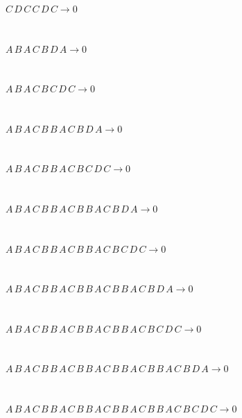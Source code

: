 \begin{minipage}{6in}
$
C\,
 D\,
 C\,
 C\,
 D\,
 C\rightarrow 0
$
\end{minipage}\medskip \\
\begin{minipage}{6in}
$
A\,
 B\,
 A\,
 C\,
 B\,
 D\,
 A\rightarrow 0
$
\end{minipage}\medskip \\
\begin{minipage}{6in}
$
A\,
 B\,
 A\,
 C\,
 B\,
 C\,
 D\,
 C\rightarrow 0
$
\end{minipage}\medskip \\
\begin{minipage}{6in}
$
A\,
 B\,
 A\,
 C\,
 B\,
 B\,
 A\,
 C\,
 B\,
 D\,
 A\rightarrow 0
$
\end{minipage}\medskip \\
\begin{minipage}{6in}
$
A\,
 B\,
 A\,
 C\,
 B\,
 B\,
 A\,
 C\,
 B\,
 C\,
 D\,
 C\rightarrow 0
$
\end{minipage}\medskip \\
\begin{minipage}{6in}
$
A\,
 B\,
 A\,
 C\,
 B\,
 B\,
 A\,
 C\,
 B\,
 B\,
 A\,
 C\,
 B\,
 D\,
 A\rightarrow 0
$
\end{minipage}\medskip \\
\begin{minipage}{6in}
$
A\,
 B\,
 A\,
 C\,
 B\,
 B\,
 A\,
 C\,
 B\,
 B\,
 A\,
 C\,
 B\,
 C\,
 D\,
 C\rightarrow 0
$
\end{minipage}\medskip \\
\begin{minipage}{6in}
$
A\,
 B\,
 A\,
 C\,
 B\,
 B\,
 A\,
 C\,
 B\,
 B\,
 A\,
 C\,
 B\,
 B\,
 A\,
 C\,
 B\,
 D\,
 A\rightarrow 0
$
\end{minipage}\medskip \\
\begin{minipage}{6in}
$
A\,
 B\,
 A\,
 C\,
 B\,
 B\,
 A\,
 C\,
 B\,
 B\,
 A\,
 C\,
 B\,
 B\,
 A\,
 C\,
 B\,
 C\,
 D\,
 C\rightarrow 0
$
\end{minipage}\medskip \\
\begin{minipage}{6in}
$
A\,
 B\,
 A\,
 C\,
 B\,
 B\,
 A\,
 C\,
 B\,
 B\,
 A\,
 C\,
 B\,
 B\,
 A\,
 C\,
 B\,
 B\,
 A\,
 C\,
 B\,
 D\,
 A\rightarrow 0
$
\end{minipage}\medskip \\
\begin{minipage}{6in}
$
A\,
 B\,
 A\,
 C\,
 B\,
 B\,
 A\,
 C\,
 B\,
 B\,
 A\,
 C\,
 B\,
 B\,
 A\,
 C\,
 B\,
 B\,
 A\,
 C\,
 B\,
 C\,
 D\,
 C\rightarrow 0
$
\end{minipage}\\
\vspace{10pt}

